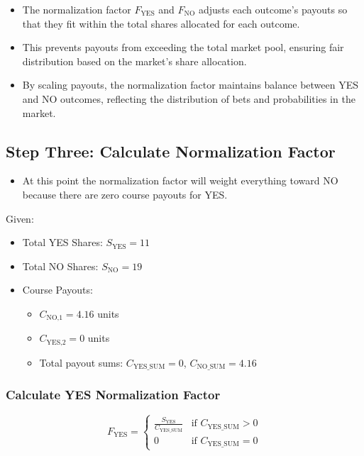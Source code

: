 \documentclass{article}
\begin{document}
\begin{itemize}
    \item The normalization factor \( F_{\text{YES}} \) and \( F_{\text{NO}} \) adjusts each outcome's payouts so that they fit within the total shares allocated for each outcome.
    \item This prevents payouts from exceeding the total market pool, ensuring fair distribution based on the market's share allocation.
    \item By scaling payouts, the normalization factor maintains balance between YES and NO outcomes, reflecting the distribution of bets and probabilities in the market.
\end{itemize}

\newpage

\subsection*{Step Three: Calculate Normalization Factor}

\begin{itemize}
    \item At this point the normalization factor will weight everything toward NO because there are zero course payouts for YES.
\end{itemize}

Given:
\begin{itemize}
    \item Total YES Shares: \( S_{\text{YES}} = 11 \)
    \item Total NO Shares: \( S_{\text{NO}} = 19 \)
    \item Course Payouts:
    \begin{itemize}
        \item \( C_{\text{NO,1}} = 4.16 \) units
        \item \( C_{\text{YES,2}} = 0 \) units
        \item Total payout sums: \( C_{\text{YES\_SUM}} = 0 \), \( C_{\text{NO\_SUM}} = 4.16 \)
    \end{itemize}
\end{itemize}

\subsubsection*{Calculate YES Normalization Factor}

\[
F_{\text{YES}} =
\begin{cases}
      \frac{S_{\text{YES}}}{C_{\text{YES\_SUM}}} & \text{if } C_{\text{YES\_SUM}} > 0 \\
      0 & \text{if } C_{\text{YES\_SUM}} = 0
   \end{cases}
\]
\end{document}
